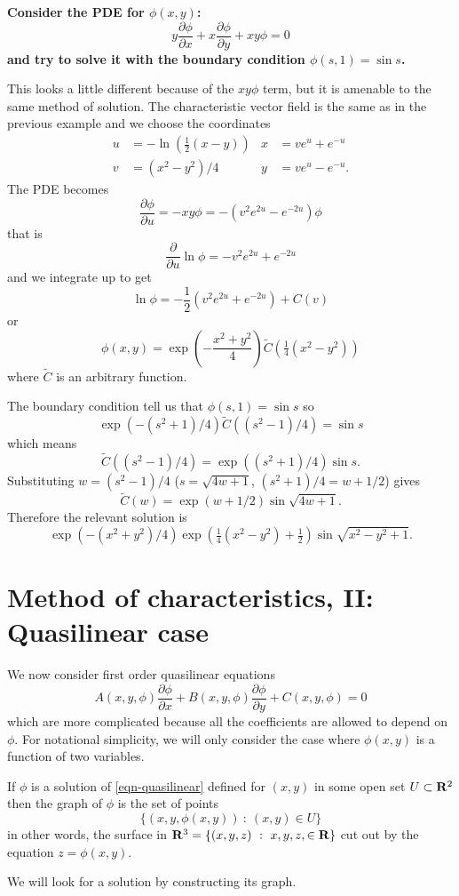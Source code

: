 \begin{exm}
{\bf Consider the PDE for $\phi(x,y)$:
\[y\frac{\partial\phi}{\partial x}+x\frac{\partial\phi}{\partial y}+xy\phi=0\]
and try to solve it with the boundary condition $\phi(s,1)=\sin s$.}

This looks a little different because of the $xy\phi$ term, but it is amenable to the same method of solution. The characteristic vector field is the same as in the previous example and we choose the coordinates
\begin{align*}
u&=-\ln\left(\tfrac{1}{2}(x-y)\right) & x&=ve^u+e^{-u}\\
v&=(x^2-y^2)/4&y&=ve^u-e^{-u}.
\end{align*}
The PDE becomes
\[\frac{\partial\phi}{\partial u}=-xy\phi=-\left(v^2e^{2u}-e^{-2u}\right)\phi\]
that is
\[\frac{\partial}{\partial u}\ln\phi=-v^2e^{2u}+e^{-2u}\]
and we integrate up to get
\[\ln\phi=-\frac{1}{2}\left(v^2e^{2u}+e^{-2u}\right)+C(v)\]
or
\[\phi(x,y)=\exp\left(-\frac{x^2+y^2}{4}\right)\tilde{C}\left(\tfrac{1}{4}(x^2-y^2)\right)\]
where $\tilde{C}$ is an arbitrary function.

The boundary condition tell us that $\phi(s,1)=\sin s$ so
\[\exp(-(s^2+1)/4)\tilde{C}((s^2-1)/4)=\sin s\]
which means
\[\tilde{C}((s^2-1)/4)=\exp((s^2+1)/4)\sin s.\]
Substituting $w=(s^2-1)/4$ ($s=\sqrt{4w+1}$, $(s^2+1)/4=w+1/2$) gives
\[\tilde{C}(w)=\exp(w+1/2)\sin\sqrt{4w+1}.\]
Therefore the relevant solution is
\[\exp(-(x^2+y^2)/4)\exp\left(\tfrac{1}{4}(x^2-y^2)+\tfrac{1}{2}\right)\sin\sqrt{x^2-y^2+1}.\]
\end{exm}

\chapter[Method of characteristics, II]{Method of characteristics, II: Quasilinear case}

We now consider first order quasilinear equations
\begin{equation}\label{eqn-quasilinear}A(x,y,\phi)\frac{\partial\phi}{\partial x}+B(x,y,\phi)\frac{\partial\phi}{\partial y}+C(x,y,\phi)=0\end{equation}
which are more complicated because all the coefficients are allowed to depend on $\phi$. For notational simplicity, we will only consider the case where $\phi(x,y)$ is a function of two variables.
\begin{dfn}
If $\phi$ is a solution of \eqref{eqn-quasilinear} defined for $(x,y)$ in some open set $U\subset\mathbf{R}^2$ then the graph of $\phi$ is the set of points
\[\{(x,y,\phi(x,y))\ :\ (x,y)\in U\}\]
in other words, the surface in $\mathbf{R}^3=\{(x,y,z)\ :\ x,y,z,\in\mathbf{R}\}$ cut out by the equation $z=\phi(x,y)$.
\end{dfn}
We will look for a solution by constructing its graph.


